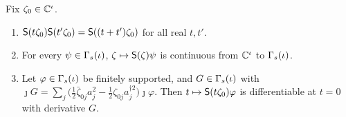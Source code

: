 \begin{veteenv}
\begin{theorem}\label{thm:dsq-squeeze-group}
Fix $\zeta_0\in\mathbb C^\iota$.
\begin{enumerate}
\item[(a)] $\mathsf S(t\zeta_0)\mathsf S(t'\zeta_0)=\mathsf S((t+t')\zeta_0)$ for all real $t,t'$.
\item[(b)] For every $\psi\in\Gamma_s(\iota)$, $\zeta\mapsto\mathsf S(\zeta)\psi$ is continuous from $\mathbb C^\iota$ to $\Gamma_s(\iota)$.
\item[(c)] Let $\varphi\in\Gamma_s(\iota)$ be finitely supported, and $G\in\Gamma_s(\iota)$ with
$\jmath G=\sum_j\bigl(\tfrac12\bar\zeta_{0j}a_j^2-\tfrac12\zeta_{0j}a_j^{\dagger2}\bigr)\jmath\varphi$. Then $t\mapsto\mathsf S(t\zeta_0)\varphi$ is
differentiable at $t=0$ with derivative $G$.
\end{enumerate}
\end{theorem}


\end{veteenv}

